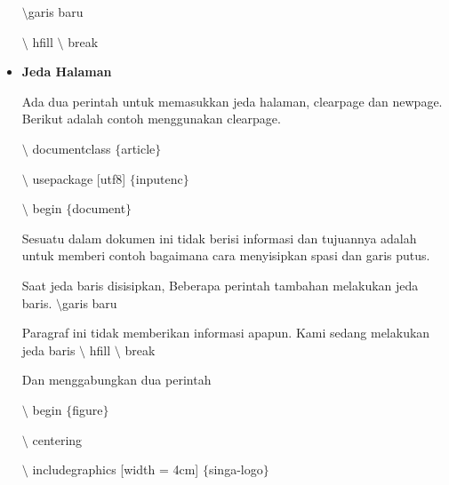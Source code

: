 \begin{itemize}
\hspace*{0.5in}$\setminus$garis baru\par

\hspace*{0.5in}$\setminus$ hfill $\setminus$ break\par

\vspace{10pt}
	\item {\fontsize{14pt}{14pt}\selectfont \textbf{Jeda Halaman}}\par

Ada dua perintah untuk memasukkan jeda halaman, clearpage dan newpage. Berikut adalah contoh menggunakan clearpage.\par

\hspace*{0.5in}$\setminus$ documentclass $ \{ $article$ \} $\par

\hspace*{0.5in}$\setminus$ usepackage [utf8] $ \{ $inputenc$ \} $\par

\hspace*{0.5in}$\setminus$ begin $ \{ $document$ \} $\par

Sesuatu dalam dokumen ini tidak berisi informasi dan tujuannya adalah untuk memberi contoh bagaimana cara menyisipkan spasi dan garis putus.\par

Saat jeda baris disisipkan, Beberapa perintah tambahan melakukan jeda baris. $\setminus$garis baru\par

Paragraf ini tidak memberikan informasi apapun. Kami sedang melakukan jeda baris $\setminus$ hfill $\setminus$ break\par

Dan menggabungkan dua perintah\par

\hspace*{0.5in}$\setminus$ begin $ \{ $figure$ \} $\par

\hspace*{0.5in}$\setminus$ centering\par

\hspace*{0.5in}$\setminus$ includegraphics [width = 4cm] $ \{ $singa-logo$ \} $\par


\end{itemize}
